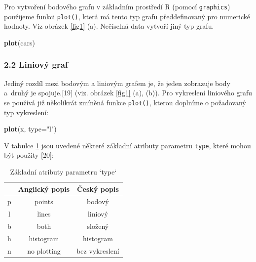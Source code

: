 \documentclass[12pt,]{article}
\newenvironment{Shaded}{\begin{snugshade}}{\end{snugshade}}
\newcommand{\KeywordTok}[1]{\textcolor[rgb]{0.13,0.29,0.53}{\textbf{#1}}}
\newcommand{\DataTypeTok}[1]{\textcolor[rgb]{0.13,0.29,0.53}{#1}}
\newcommand{\StringTok}[1]{\textcolor[rgb]{0.31,0.60,0.02}{#1}}
\newcommand{\NormalTok}[1]{#1}
\begin{document}
\qquad Pro vytvoření bodového grafu v základním prostředí R (pomocí
\texttt{graphics}) použijeme funkci \texttt{plot()}, která má tento typ
grafu předdefinovaný pro numerické hodnoty. Viz obrázek \ref{fig1} (a).
Nečíselná data vytvoří jiný typ grafu.

\begin{Shaded}
\begin{Highlighting}[]
\KeywordTok{plot}\NormalTok{(cars)}
\end{Highlighting}
\end{Shaded}

\subsubsection{2.2 Liniový graf}\label{liniovy-graf}

\qquad Jediný rozdíl mezi bodovým a liniovým grafem je, že jeden
zobrazuje body a~druhý je spojuje.{[}19{]} (viz. obrázek \ref{fig1} (a),
(b)). Pro vykreslení liniového grafu se používá již několikrát zmíněná
funkce \texttt{plot()}, kterou doplníme o požadovaný typ vykreslení:

\begin{Shaded}
\begin{Highlighting}[]
\KeywordTok{plot}\NormalTok{(x, }\DataTypeTok{type=}\StringTok{"l"}\NormalTok{)}
\end{Highlighting}
\end{Shaded}

V tabulce \ref{tab1} jsou uvedené některé základní atributy parametru
\texttt{type}, které mohou být použity {[}20{]}:

\begin{table}[H]
\centering
\begin{tabular}{@{}ccc@{}}
\toprule
  & Anglický popis & Český popis    \\ \midrule
p & points         & bodový         \\
l & lines          & liniový        \\
b & both           & složený        \\
h & histogram      & histogram      \\
n & no plotting    & bez vykreslení \\ \bottomrule
\end{tabular}
\caption{Základní atributy parametru `type`}
\label{tab1}
\end{table}
\end{document}
